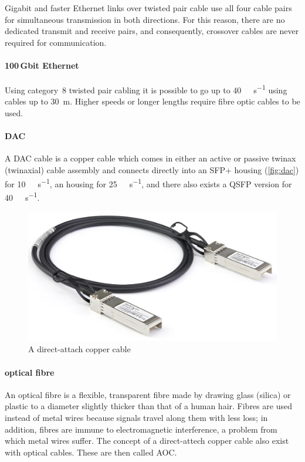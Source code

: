 Gigabit and faster Ethernet links over twisted pair cable use all four cable pairs for simultaneous transmission in both directions.
For this reason, there are no dedicated transmit and receive pairs, and consequently, crossover cables are never required for  communication.

\paragraph{100\,Gbit Ethernet}
Using category~8 twisted pair cabling it is possible to go up to \SI{40}{\giga\bit\per\second} using cables up to \SI{30}{\metre}.
Higher speeds or longer lengths require fibre optic cables to be used.

\paragraph{\acl{DAC}}
A \acf{DAC} cable is a copper cable which comes in either an active or passive twinax (twinaxial) cable assembly and connects directly into an
\acs{SFP+} housing (\vref{fig:dac}) for \SI{10}{\giga\bit\per\second},
an  housing for \SI{25}{\giga\bit\per\second},
and there also exists a \acs{QSFP} version for \SI{40}{\giga\bit\per\second}.

\begin{figure}
\centering
\includegraphics[width=\textwidth]{images/physical/dac-cable.jpeg}
\caption{A direct-attach copper cable}
\label{fig:dac}
\end{figure}

\paragraph{optical fibre}
An optical fibre is a flexible, transparent fibre made by drawing glass (silica) or plastic to a diameter slightly thicker than that of a human hair.
Fibres are used instead of metal wires because signals travel along them with less loss; in addition, fibres are immune to electromagnetic interference, a problem from which metal wires suffer.
The concept of a direct-attech copper cable also exist with optical cables.
These are then called \acf{AOC}.

